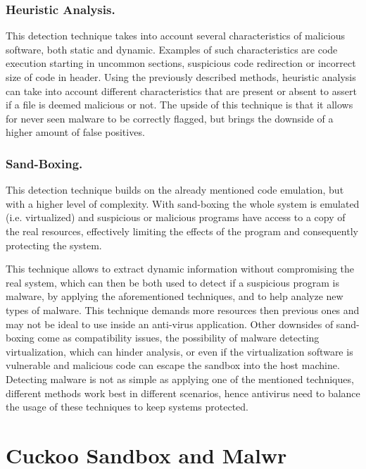 \subsubsection{Heuristic Analysis.} This detection technique takes into account several characteristics of malicious software, both static and dynamic. Examples of such characteristics are code execution starting in uncommon sections, suspicious code redirection or incorrect size of code in header. Using the previously described methods, heuristic analysis can take into account different characteristics that are present or absent to assert if a file is deemed malicious or not. The upside of this technique is that it allows for never seen malware to be correctly flagged, but brings the downside of a higher amount of false positives.

\subsubsection{Sand-Boxing.} This detection technique builds on the already mentioned code emulation, but with a higher level of complexity. With sand-boxing the whole system is emulated (i.e. virtualized) and suspicious or malicious programs have access to a copy of the real resources, effectively limiting the effects of the program and consequently protecting the system.

This technique allows to extract dynamic information without compromising the real system, which can then be both used to detect if a suspicious program is malware, by applying the aforementioned techniques, and to help analyze new types of malware. This technique demands more resources then previous ones and may not be ideal to use inside an anti-virus application. Other downsides of sand-boxing come as compatibility issues, the possibility of malware detecting virtualization, which can hinder analysis, or even if the virtualization software is vulnerable and malicious code can escape the sandbox into the host machine.\\

Detecting malware is not as simple as applying one of the mentioned techniques, different methods work best in different scenarios, hence antivirus need to balance the usage of these techniques to keep systems protected.

\section{Cuckoo Sandbox and Malwr}
\label{section:cuckoo}

